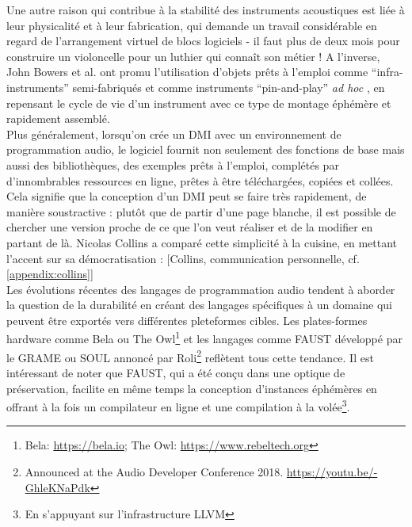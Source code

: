 \noindent Une autre raison qui contribue à la stabilité des instruments acoustiques est liée à leur physicalité et à leur fabrication, qui demande un travail considérable en regard de l'arrangement virtuel de blocs logiciels - il faut plus de deux mois pour construire un violoncelle pour un luthier qui connaît son métier ! A l'inverse, John Bowers et al. ont promu l'utilisation d'objets prêts à l'emploi comme ``infra-instruments'' semi-fabriqués \cite{bowers_not_2005} et comme instruments ``pin-and-play'' \textit{ad hoc} \cite{bowers_creating_2006}, en repensant le cycle de vie d'un instrument avec ce type de montage éphémère et rapidement assemblé.\\
\indent Plus généralement, lorsqu'on crée un \gls{DMI} avec un environnement de programmation audio, le logiciel fournit non seulement des fonctions de base mais aussi des bibliothèques, des exemples prêts à l'emploi, complétés par d'innombrables ressources en ligne, prêtes à être téléchargées, copiées et collées.\\
\indent Cela signifie que la conception d'un \gls{DMI} peut se faire très rapidement, de manière soustractive : plutôt que de partir d'une page blanche, il est possible de chercher une version proche de ce que l'on veut réaliser et de la modifier en partant de là. Nicolas Collins a comparé cette simplicité à la cuisine, en mettant l'accent sur sa démocratisation :  [Collins, communication personnelle, cf. \ref{appendix:collins}]\\
\indent Les évolutions récentes des langages de programmation audio tendent à aborder la question de la durabilité en créant des langages spécifiques à un domaine qui peuvent être exportés vers différentes pleteformes cibles. Les plates-formes hardware comme Bela ou The Owl\footnote{Bela: \url{https://bela.io}; The Owl: \url{https://www.rebeltech.org}} et les langages comme \gls{FAUST} développé par le \gls{GRAME} \cite{orlarey_faust_2008} ou SOUL annoncé par Roli\footnote{Announced at the Audio Developer Conference 2018. \url{https://youtu.be/-GhleKNaPdk}} reflètent tous cette tendance. Il est intéressant de noter que \gls{FAUST}, qui a été conçu dans une optique de préservation, facilite en même temps la conception d'instances éphémères en offrant à la fois un compilateur en ligne et une compilation à la volée\footnote{En s'appuyant sur l'infrastructure \gls{LLVM}}.
	
